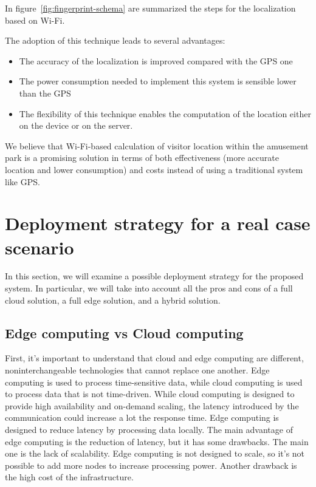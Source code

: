 In figure~\ref{fig:fingerprint-schema} are summarized the steps for the localization based on Wi-Fi.

The adoption of this technique leads to several advantages:
\begin{itemize}
	\item The accuracy of the localization is improved compared with the GPS one~\cite{du2018hybrid}
	\item The power consumption needed to implement this system is sensible lower than the GPS~\cite{du2018hybrid}
	\item The flexibility of this technique enables the computation of the location either on the device or on the server.
\end{itemize}

We believe that Wi-Fi-based calculation of visitor location within the amusement park is a promising solution in terms of both effectiveness (more
accurate location and lower consumption) and costs instead of using a traditional system like GPS.

\section{Deployment strategy for a real case scenario}
In this section, we will examine a possible deployment strategy for the proposed system. In particular, we will take into account all the pros and
cons of a full cloud solution, a full edge solution, and a hybrid solution.

\subsection{Edge computing vs Cloud computing}
First, it's important to understand that cloud and edge computing are different, noninterchangeable technologies that cannot replace one another.
Edge computing is used to process time-sensitive data, while cloud computing is used to process data that is not time-driven. While cloud computing
is designed to provide high availability and on-demand scaling, the latency introduced by the communication could increase a lot the response time.
Edge computing is designed to reduce latency by processing data locally. The main advantage of edge computing is the reduction of latency, but it has
some drawbacks. The main one is the lack of scalability. Edge computing is not designed to scale, so it's not possible to add more nodes to increase
processing power. Another drawback is the high cost of the infrastructure.

